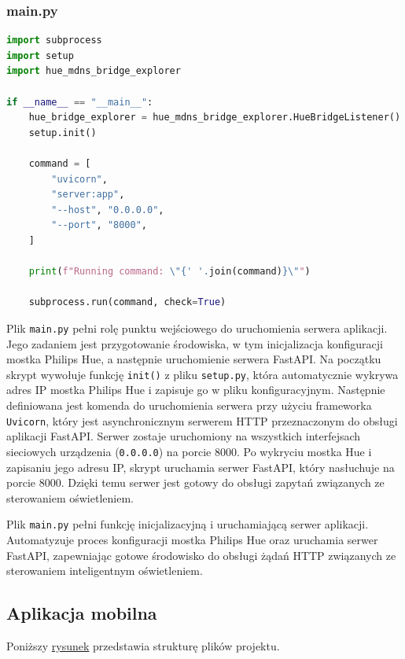 \documentclass[12pt]{article}
\begin{document}
\subsubsection{ main.py}
\begin{lstlisting}[language=Python]
import subprocess
import setup
import hue_mdns_bridge_explorer

if __name__ == "__main__":
    hue_bridge_explorer = hue_mdns_bridge_explorer.HueBridgeListener()
    setup.init()

    command = [
        "uvicorn",
        "server:app",
        "--host", "0.0.0.0",
        "--port", "8000",
    ]

    print(f"Running command: \"{' '.join(command)}\"")

    subprocess.run(command, check=True)
\end{lstlisting}
Plik \texttt{main.py} pełni rolę punktu wejściowego do uruchomienia serwera aplikacji. Jego zadaniem jest przygotowanie środowiska, w tym inicjalizacja konfiguracji mostka Philips Hue,
a następnie uruchomienie serwera FastAPI. Na początku skrypt wywołuje funkcję \texttt{init()} z pliku \texttt{setup.py}, która automatycznie wykrywa adres IP mostka Philips Hue i zapisuje
go w pliku konfiguracyjnym. Następnie definiowana jest komenda do uruchomienia serwera przy użyciu frameworka \texttt{Uvicorn}, który jest asynchronicznym serwerem HTTP przeznaczonym do obsługi
aplikacji FastAPI. Serwer zostaje uruchomiony na wszystkich interfejsach sieciowych urządzenia (\texttt{0.0.0.0}) na porcie 8000. Po wykryciu mostka Hue i zapisaniu jego adresu IP, skrypt uruchamia
serwer FastAPI, który nasłuchuje na porcie 8000. Dzięki temu serwer jest gotowy do obsługi zapytań związanych ze sterowaniem oświetleniem.

Plik \texttt{main.py} pełni funkcję inicjalizacyjną i uruchamiającą serwer aplikacji. Automatyzuje proces konfiguracji mostka Philips Hue oraz uruchamia serwer FastAPI, zapewniając gotowe
środowisko do obsługi żądań HTTP związanych ze sterowaniem inteligentnym oświetleniem.

\clearpage

\subsection{Aplikacja mobilna}
Poniższy \hyperlink{fig:struktura-plików-aplikacja-mobilna}{rysunek} przedstawia strukturę plików projektu.
\end{document}
